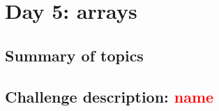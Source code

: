 \chapter{Day 5: arrays}

\section{Summary of topics}

\section{Challenge description: \textcolor{red}{name}}
